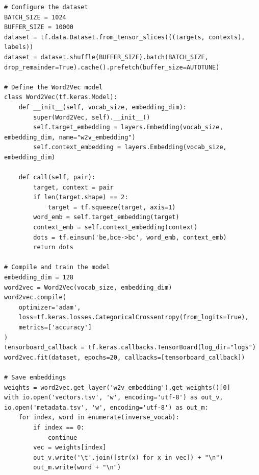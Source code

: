 \begin{lstlisting}
# Configure the dataset
BATCH_SIZE = 1024
BUFFER_SIZE = 10000
dataset = tf.data.Dataset.from_tensor_slices(((targets, contexts), labels))
dataset = dataset.shuffle(BUFFER_SIZE).batch(BATCH_SIZE, drop_remainder=True).cache().prefetch(buffer_size=AUTOTUNE)

# Define the Word2Vec model
class Word2Vec(tf.keras.Model):
    def __init__(self, vocab_size, embedding_dim):
        super(Word2Vec, self).__init__()
        self.target_embedding = layers.Embedding(vocab_size, embedding_dim, name="w2v_embedding")
        self.context_embedding = layers.Embedding(vocab_size, embedding_dim)

    def call(self, pair):
        target, context = pair
        if len(target.shape) == 2:
            target = tf.squeeze(target, axis=1)
        word_emb = self.target_embedding(target)
        context_emb = self.context_embedding(context)
        dots = tf.einsum('be,bce->bc', word_emb, context_emb)
        return dots

# Compile and train the model
embedding_dim = 128
word2vec = Word2Vec(vocab_size, embedding_dim)
word2vec.compile(
    optimizer='adam',
    loss=tf.keras.losses.CategoricalCrossentropy(from_logits=True),
    metrics=['accuracy']
)
tensorboard_callback = tf.keras.callbacks.TensorBoard(log_dir="logs")
word2vec.fit(dataset, epochs=20, callbacks=[tensorboard_callback])

# Save embeddings
weights = word2vec.get_layer('w2v_embedding').get_weights()[0]
with io.open('vectors.tsv', 'w', encoding='utf-8') as out_v, io.open('metadata.tsv', 'w', encoding='utf-8') as out_m:
    for index, word in enumerate(inverse_vocab):
        if index == 0:
            continue
        vec = weights[index]
        out_v.write('\t'.join([str(x) for x in vec]) + "\n")
        out_m.write(word + "\n")



    
\end{lstlisting}